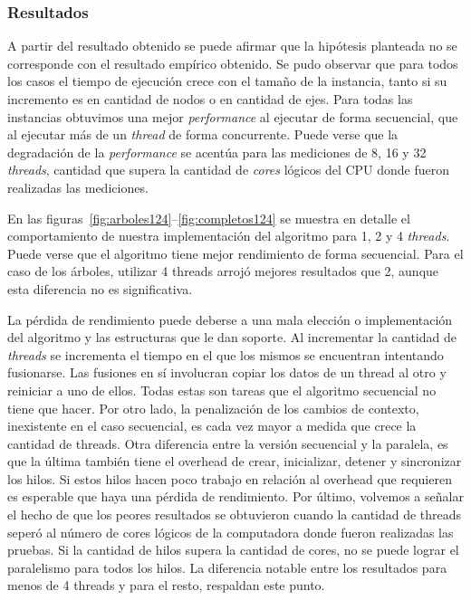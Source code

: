 \subsubsection{Resultados}
A partir del resultado obtenido se puede afirmar que la hipótesis planteada no 
se corresponde con el resultado empírico obtenido.
Se pudo observar que para todos los casos el tiempo de ejecución crece con el
tamaño de la instancia, tanto si su incremento es en cantidad de nodos o en
cantidad de ejes.
Para todas las instancias obtuvimos una mejor
\textit{performance} al ejecutar de forma secuencial, que al ejecutar más de un
\textit{thread} de forma
concurrente.
Puede verse que la degradación de la \textit{performance} se acentúa para las
mediciones de 8, 16 y 32 \textit{threads}, cantidad que supera la cantidad de
\textit{cores} lógicos del CPU donde fueron realizadas las mediciones.

En las figuras~\ref{fig:arboles124}--\ref{fig:completos124} se muestra en
detalle el comportamiento de nuestra implementación del algoritmo para 1, 2 y 4
\textit{threads}. Puede verse que el algoritmo tiene mejor rendimiento de forma
secuencial. Para el caso de los árboles, utilizar 4 threads arrojó
mejores resultados que 2, aunque esta diferencia no es significativa.

La pérdida de rendimiento puede deberse a una mala elección o implementación
del algoritmo y las estructuras que le dan soporte. Al incrementar la 
cantidad de \textit{threads} se incrementa el tiempo en el que los mismos se
 encuentran intentando fusionarse. Las fusiones en sí involucran copiar los 
 datos de un thread al otro y reiniciar a uno de ellos. Todas estas son tareas 
 que el algoritmo secuencial no tiene que hacer. Por otro lado, la penalización
  de los cambios de contexto, inexistente en el caso secuencial, es cada vez 
  mayor a medida que crece la cantidad de threads.
  Otra diferencia entre la versión secuencial y la paralela, es que la última 
  también tiene el overhead de crear, inicializar, detener y sincronizar los 
  hilos. Si estos hilos hacen poco trabajo en relación al overhead que 
  requieren es esperable que haya una pérdida de rendimiento. Por último, 
  volvemos a señalar el hecho de que los peores resultados se obtuvieron 
  cuando la cantidad de threads seperó al número de cores lógicos de la 
  computadora donde fueron realizadas las pruebas. Si la cantidad de hilos 
  supera la cantidad de cores, no se puede lograr el paralelismo para todos 
  los hilos. La diferencia notable entre los resultados para menos de 4 threads
   y para el resto, respaldan este punto.

